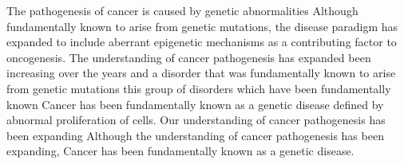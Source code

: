 The pathogenesis of cancer is caused by genetic abnormalities
Although fundamentally known to arise from genetic mutations, the disease paradigm has expanded to include aberrant epigenetic mechanisms as a contributing factor to oncogenesis.
The understanding of cancer pathogenesis has expanded been increasing over the years and a disorder that was fundamentally known to arise from genetic mutations this group of disorders which have been fundamentally known Cancer has been fundamentally known as a genetic disease defined by abnormal proliferation of cells.
Our understanding of cancer pathogenesis has been expanding  Although the understanding of cancer pathogenesis has been expanding, Cancer has been fundamentally known as a genetic disease.
